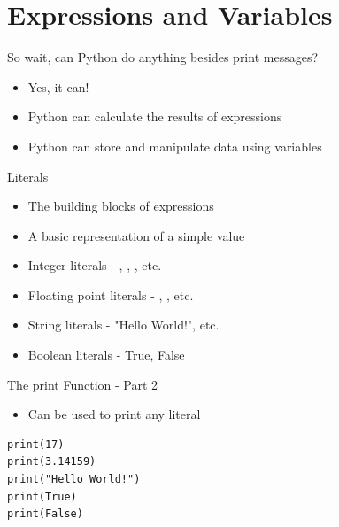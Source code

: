 \section{Expressions and Variables}

\begin{frame}{So wait, can Python do anything besides print messages?}
  \begin{itemize}
    \item Yes, it can!
    \item Python can calculate the results of expressions
    \item Python can store and manipulate data using variables
  \end{itemize}
\end{frame}

\begin{frame}{Literals}
  \begin{itemize}
    \item The building blocks of expressions
    \item A basic representation of a simple value
    \item Integer literals - {}, {}, {}, etc.
    \item Floating point literals - {}, {}, etc.
    \item String literals - {\ttfamily "Hello World!"}, etc.
    \item Boolean literals - {\ttfamily True}, {\ttfamily False}
  \end{itemize}
\end{frame}

\begin{frame}[fragile]{The {\ttfamily print} Function - Part 2}
  \begin{itemize}
    \item Can be used to print any literal
  \end{itemize}
\begin{lstlisting}
print(17)
print(3.14159)
print("Hello World!")
print(True)
print(False)
\end{lstlisting}
\end{frame}

